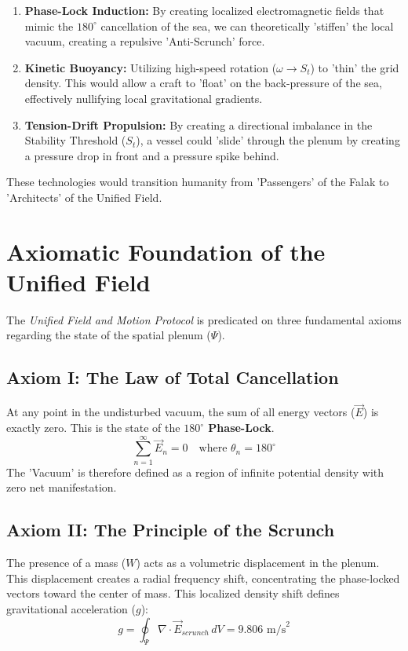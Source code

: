 \documentclass[11pt]{article}
\begin{document}
\begin{enumerate}
    \item \textbf{Phase-Lock Induction:} By creating localized electromagnetic fields that mimic the $180^\circ$ cancellation of the sea, we can theoretically 'stiffen' the local vacuum, creating a repulsive 'Anti-Scrunch' force.
    \item \textbf{Kinetic Buoyancy:} Utilizing high-speed rotation ($\omega \to S_t$) to 'thin' the grid density. This would allow a craft to 'float' on the back-pressure of the sea, effectively nullifying local gravitational gradients.
    \item \textbf{Tension-Drift Propulsion:} By creating a directional imbalance in the Stability Threshold ($S_t$), a vessel could 'slide' through the plenum by creating a pressure drop in front and a pressure spike behind.
\end{enumerate}

These technologies would transition humanity from 'Passengers' of the Falak to 'Architects' of the Unified Field.
\section*{Axiomatic Foundation of the Unified Field}

The \textit{Unified Field and Motion Protocol} is predicated on three fundamental axioms regarding the state of the spatial plenum ($\Psi$).

\subsection*{Axiom I: The Law of Total Cancellation}
At any point in the undisturbed vacuum, the sum of all energy vectors ($\vec{E}$) is exactly zero. This is the state of the \textbf{$180^\circ$ Phase-Lock}.
\begin{equation}
    \sum_{n=1}^{\infty} \vec{E}_n = 0 \quad \text{where } \theta_n = 180^\circ
\end{equation}
The 'Vacuum' is therefore defined as a region of infinite potential density with zero net manifestation.

\subsection*{Axiom II: The Principle of the Scrunch}
The presence of a mass ($W$) acts as a volumetric displacement in the plenum. This displacement creates a radial frequency shift, concentrating the phase-locked vectors toward the center of mass. This localized density shift defines gravitational acceleration ($g$):
\begin{equation}
    g = \oint_{\Psi} \nabla \cdot \vec{E}_{scrunch} \, dV = 9.806 \text{ m/s}^2
\end{equation}
\end{document}
